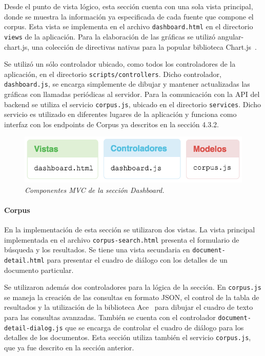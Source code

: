 Desde el punto de vista lógico, esta sección cuenta con una sola vista principal, donde se muestra la
información ya especificada de cada fuente que compone el corpus. Esta vista se implementa en el archivo
\texttt{dashboard.html} en el directorio \texttt{views} de la aplicación. Para la elaboración de las
gráficas se utilizó angular-chart.js, una colección de directivas nativas para la popular biblioteca
Chart.js~\cite{Chartjs}.

Se utilizó un sólo controlador ubicado, como todos los controladores de la aplicación, en el directorio
\texttt{scripts/controllers}. Dicho controlador, \texttt{dashboard.js}, se encarga simplemente de dibujar
y mantener actualizadas las gráficas con llamadas periódicas al servidor. Para la comunicación con la
API del backend se utiliza el servicio \texttt{corpus.js}, ubicado en el directorio \texttt{services}. Dicho
servicio es utilizado en diferentes lugares de la aplicación y funciona como interfaz con los endpoints
de Corpus ya descritos en la sección 4.3.2.

\begin{figure}[h]
    \centering
    \includegraphics[width=\textwidth]{images/ui-nabu-mvc-dashboard}
    \caption{\textit{Componentes MVC de la sección Dashboard.}}
    \label{fig:ui-nabu-mvc-dashboard}
\end{figure}

\paragraph{Corpus}

En la implementación de esta sección se utilizaron dos vistas. La vista principal implementada en el
archivo \texttt{corpus-search.html} presenta el formulario de búsqueda y los resultados. Se tiene una
vista secundaria en \texttt{document-detail.html} para presentar el cuadro de diálogo con los detalles
de un documento particular.

Se utilizaron además dos controladores para la lógica de la sección. En \texttt{corpus.js} se maneja la
creación de las consultas en formato JSON, el control de la tabla de resultados y la utilización de la
biblioteca Ace~\cite{AceJS} para dibujar el cuadro de texto para las consultas avanzadas. También se cuenta
con el controlador \texttt{document-detail-dialog.js} que se encarga de controlar el cuadro de diálogo
para los detalles de los documentos. Esta sección utiliza también el servicio \texttt{corpus.js}, que ya fue
descrito en la sección anterior.

